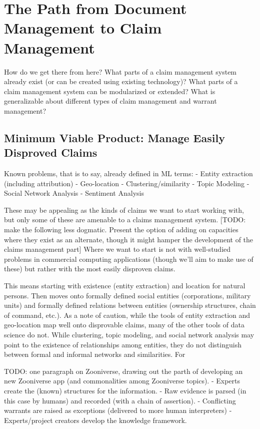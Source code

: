 \documentclass[format=siggraph, review=true]{acmart}
\begin{document}
\section{The Path from Document Management to Claim Management}
How do we get there from here? What parts of a claim management system already exist (or can be created using existing technology)? What parts of a claim management system can be modularized or extended? What is generalizable about different types of claim management and warrant management? 

\subsection{Minimum Viable Product: Manage Easily Disproved Claims}
Known problems, that is to say, already defined in ML terms: 
- Entity extraction (including attribution)
- Geo-location
- Clustering/similarity
- Topic Modeling
- Social Network Analysis
- Sentiment Analysis

These may be appealing as the kinds of claims we want to start working with, but only some of these are amenable to a claims management system. [TODO: make the following less dogmatic. Present the option of adding on capacities where they exist as an alternate, though it might hamper the development of the claims management part] Where we want to start is not with well-studied problems in commercial computing applications (though we'll aim to make use of these) but rather with the most easily disproven claims. 

This means starting with existence (entity extraction) and location for natural persons. Then moves onto formally defined social entities (corporations, military units) and formally defined relations between entities (ownership structures, chain of command, etc.). As a note of caution, while the tools of entity extraction and geo-location map well onto disprovable claims, many of the other tools of data science do not. While clustering, topic modeling, and social network analysis may point to the existence of relationships among entities, they do not distinguish between formal and informal networks and similarities. For 

TODO: one paragraph on Zooniverse, drawing out the parth of developing an new Zooniverse app (and commonalities among Zooniverse topics).  
- Experts create the (known) structures for the information. 
- Raw evidence is parsed (in this case by humans) and recorded (with a chain of assertion). 
- Conflicting warrants are raised as exceptions (delivered to more human interpreters)
- Experts/project creators develop the knowledge framework. 
\end{document}
